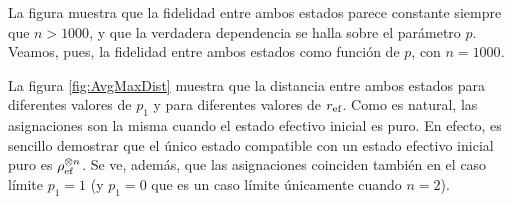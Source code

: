 La figura  muestra que la fidelidad entre ambos estados parece constante siempre que $n>1000$, y que la verdadera dependencia se halla sobre el parámetro $p$. Veamos, pues, la fidelidad entre ambos estados como función de $p$, con $n=1000$.

La figura \ref{fig:AvgMaxDist} muestra que la distancia entre ambos estados para diferentes valores de $p_{1}$ y para diferentes valores de $r_{\text{ef}}$. Como es natural, las asignaciones son la misma cuando el estado efectivo inicial es puro. En efecto, es sencillo demostrar que el único estado compatible con un estado efectivo inicial puro es $\rho_{\text{ef}}^{\otimes n}$. Se ve, además, que las asignaciones coinciden también en el caso límite $p_{1}=1$ (y $p_{1}=0$ que es un caso límite únicamente cuando $n=2$).
